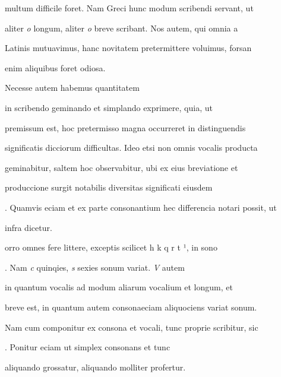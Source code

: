 multum difficile foret. Nam Greci hunc modum scribendi servant, ut

aliter \textit{o} longum, aliter \textit{o} breve scribant. Nos autem, qui omnia a

Latinis mutuavimus, hanc novitatem pretermittere voluimus, forsan

\splitlines{}

enim aliquibus foret odiosa.

\indentK Necesse autem habemus quantitatem 

\fulllines{}

 in scribendo geminando et simplando exprimere, quia, ut

premissum est, hoc pretermisso magna occurreret in distinguendis

significatis dicciorum difficultas. Ideo etsi non omnis vocalis producta

geminabitur, saltem hoc observabitur, ubi ex eius breviatione et

produccione surgit notabilis diversitas significati eiusdem 

. Quamvis eciam et ex parte consonantium hec differencia notari possit, ut

\splitlines{}



infra dicetur.

\indentK {}orro omnes fere littere, exceptis scilicet  h  k q r t ¹, in sono 

. Nam \textit{c} quinqies, \textit{s} sexies sonum variat. \textit{V} autem

in quantum vocalis ad modum aliarum vocalium et longum, et

breve est, in quantum autem consonaeciam aliquociens variat sonum.

Nam cum componitur ex consona et vocali, tunc proprie scribitur, sic

 . Ponitur eciam ut simplex consonans et tunc


\fullpreviouslines


{
\color{blue}


aliquando grossatur, aliquando molliter profertur.

}

